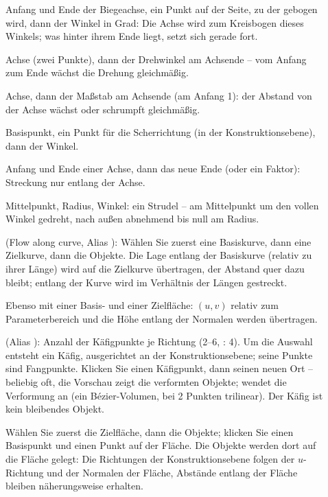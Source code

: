 \begin{description}
\item[] Anfang und Ende der Biegeachse, ein Punkt auf der Seite, zu der gebogen wird,
  dann der Winkel in Grad: Die Achse wird zum Kreisbogen dieses Winkels; was hinter ihrem Ende
  liegt, setzt sich gerade fort.
\item[] Achse (zwei Punkte), dann der Drehwinkel am Achsende -- vom Anfang zum Ende
  wächst die Drehung gleichmäßig.
\item[] Achse, dann der Maßstab am Achsende (am Anfang 1): der Abstand von der Achse
  wächst oder schrumpft gleichmäßig.
\item[] Basispunkt, ein Punkt für die Scherrichtung (in der Konstruktionsebene), dann
  der Winkel.
\item[] Anfang und Ende einer Achse, dann das neue Ende (oder ein Faktor): Streckung
  nur entlang der Achse.
\item[] Mittelpunkt, Radius, Winkel: ein Strudel -- am Mittelpunkt um den vollen
  Winkel gedreht, nach außen abnehmend bis null am Radius.
\item[] (Flow along curve, Alias ): Wählen Sie zuerst eine
  Basiskurve, dann eine Zielkurve, dann die Objekte. Die Lage entlang der Basiskurve (relativ zu
  ihrer Länge) wird auf die Zielkurve übertragen, der Abstand quer dazu bleibt; entlang der Kurve
  wird im Verhältnis der Längen gestreckt.
\item[] Ebenso mit einer Basis- und einer Zielfläche: $(u, v)$ relativ zum
  Parameterbereich und die Höhe entlang der Normalen werden übertragen.
\item[] (Alias ): Anzahl der Käfigpunkte je Richtung (2--6,
  : 4). Um die Auswahl entsteht ein Käfig, ausgerichtet an der Konstruktionsebene;
  seine Punkte sind Fangpunkte. Klicken Sie einen Käfigpunkt, dann seinen neuen Ort -- beliebig
  oft, die Vorschau zeigt die verformten Objekte;  wendet die Verformung an (ein
  Bézier-Volumen, bei 2 Punkten trilinear). Der Käfig ist kein bleibendes Objekt.
\item[] Wählen Sie zuerst die Zielfläche, dann die Objekte; klicken Sie einen Basispunkt
  und einen Punkt auf der Fläche. Die Objekte werden dort auf die Fläche gelegt: Die Richtungen der
  Konstruktionsebene folgen der $u$-Richtung und der Normalen der Fläche, Abstände entlang der
  Fläche bleiben näherungsweise erhalten.
\end{description}

